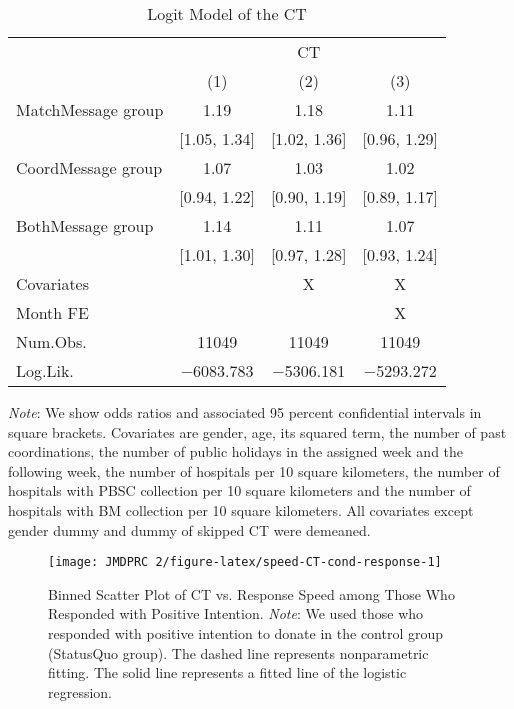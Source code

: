 \documentclass[12pt, a4paper]{article}
\begin{document}
\begin{table}[H]

\caption{\label{tab:logit-test}Logit Model of the CT}
\centering
\fontsize{8}{10}\selectfont
\begin{threeparttable}
\begin{tabular}[t]{>{\raggedright\arraybackslash}p{20em}ccc}
\toprule
\multicolumn{1}{c}{ } & \multicolumn{3}{c}{CT} \\
\cmidrule(l{3pt}r{3pt}){2-4}
  & (1) & (2) & (3)\\
\midrule
MatchMessage group & \num{1.19} & \num{1.18} & \num{1.11}\\
 & {}[\num{1.05}, \num{1.34}] & {}[\num{1.02}, \num{1.36}] & {}[\num{0.96}, \num{1.29}]\\
CoordMessage group & \num{1.07} & \num{1.03} & \num{1.02}\\
 & {}[\num{0.94}, \num{1.22}] & {}[\num{0.90}, \num{1.19}] & {}[\num{0.89}, \num{1.17}]\\
BothMessage group & \num{1.14} & \num{1.11} & \num{1.07}\\
 & {}[\num{1.01}, \num{1.30}] & {}[\num{0.97}, \num{1.28}] & {}[\num{0.93}, \num{1.24}]\\
\midrule
Covariates &  & X & X\\
Month FE &  &  & X\\
Num.Obs. & \num{11049} & \num{11049} & \num{11049}\\
Log.Lik. & \num{-6083.783} & \num{-5306.181} & \num{-5293.272}\\
\bottomrule
\end{tabular}
\begin{tablenotes}
\item \emph{Note}: We show odds ratios and associated 95 percent confidential intervals in square brackets. Covariates are gender, age, its squared term, the number of past coordinations, the number of public holidays in the assigned week and the following week, the number of hospitals per 10 square kilometers, the number of hospitals with PBSC collection per 10 square kilometers and the number of hospitals with BM collection per 10 square kilometers. All covariates except gender dummy and dummy of skipped CT were demeaned.
\end{tablenotes}
\end{threeparttable}
\end{table}

\begin{figure}[H]
\texttt{[image: JMDPRC~2/figure-latex/speed-CT-cond-response-1]} \caption{Binned Scatter Plot of CT vs. Response Speed among Those Who Responded with Positive Intention. \newline \emph{Note}: We used those who responded with positive intention to donate in the control group (StatusQuo group). The dashed line represents nonparametric fitting. The solid line represents a fitted line of the logistic regression.}\label{fig:speed-CT-cond-response}
\end{figure}
\end{document}
